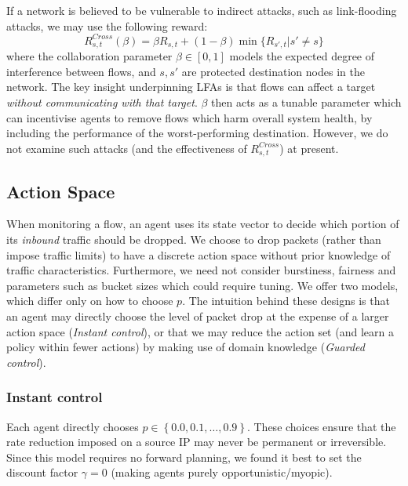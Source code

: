 \documentclass[10pt, times, conference, letterpaper]{IEEEtran}
\begin{document}
If a network is believed to be vulnerable to indirect attacks, such as link-flooding attacks, we may use the following reward:
\begin{equation}
	R_{s,t}^{\mathit{Cross}}(\beta) = \beta R_{s,t} + (1 - \beta) \min{\{R_{s',t} | s' \ne s\}} \label{eqn:lfa-reward}
\end{equation}
where the collaboration parameter $\beta \in [0,1]$ models the expected degree of interference between flows, and $s, s'$ are protected destination nodes in the network.
The key insight underpinning LFAs is that flows can affect a target \emph{without communicating with that target}.
$\beta$ then acts as a tunable parameter which can incentivise agents to remove flows which harm overall system health, by including the performance of the worst-performing destination.
However, we do not examine such attacks (and the effectiveness of $R_{s,t}^{\mathit{Cross}}$) at present.

\subsection{Action Space}
When monitoring a flow, an agent uses its state vector to decide which portion of its \emph{inbound} traffic should be dropped.
We choose to drop packets (rather than impose traffic limits) to have a discrete action space without prior knowledge of traffic characteristics.
Furthermore, we need not consider burstiness, fairness and parameters such as bucket sizes which could require tuning.
We offer two models, which differ only on how to choose $p$.
The intuition behind these designs is that an agent may directly choose the level of packet drop at the expense of a larger action space (\emph{Instant control}), or that we may reduce the action set (and learn a policy within fewer actions) by making use of domain knowledge (\emph{Guarded control}).

\subsubsection{Instant control}
Each agent directly chooses $p \in \left\{ 0.0, 0.1, \ldots, 0.9 \right\}$.
These choices ensure that the rate reduction imposed on a source IP may never be permanent or irreversible.
Since this model requires no forward planning, we found it best to set the discount factor $\gamma=0$ (making agents purely opportunistic/myopic).
\end{document}
